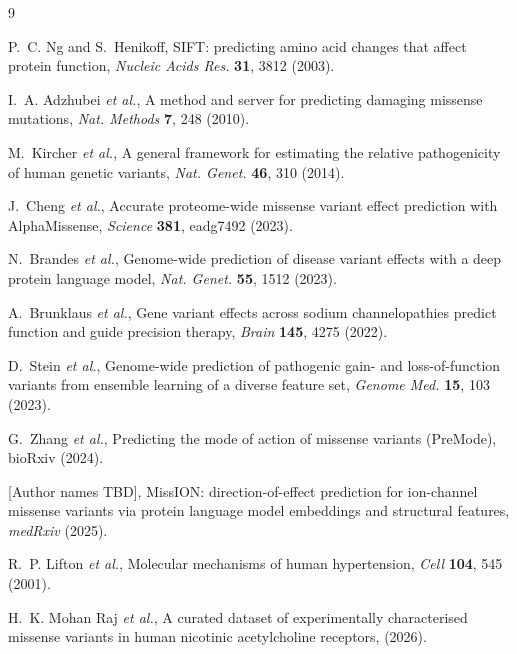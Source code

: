 \documentclass{ws-procs11x85}
\begin{document}
\begin{thebibliography}{9}

 P.~C. Ng and S.~Henikoff, SIFT: predicting amino acid
changes that affect protein function, {\em Nucleic Acids Res.}
{\bf 31}, 3812 (2003).

 I.~A. Adzhubei {\em et al.}, A method and server
for predicting damaging missense mutations, {\em Nat. Methods}
{\bf 7}, 248 (2010).

 M.~Kircher {\em et al.}, A general framework for
estimating the relative pathogenicity of human genetic variants,
{\em Nat. Genet.} {\bf 46}, 310 (2014).

 J.~Cheng {\em et al.}, Accurate proteome-wide
missense variant effect prediction with AlphaMissense, {\em Science}
{\bf 381}, eadg7492 (2023).

 N.~Brandes {\em et al.}, Genome-wide prediction of
disease variant effects with a deep protein language model,
{\em Nat. Genet.} {\bf 55}, 1512 (2023).

 A.~Brunklaus {\em et al.}, Gene variant effects
across sodium channelopathies predict function and guide precision
therapy, {\em Brain} {\bf 145}, 4275 (2022).

 D.~Stein {\em et al.}, Genome-wide prediction of
pathogenic gain- and loss-of-function variants from ensemble learning
of a diverse feature set, {\em Genome Med.} {\bf 15}, 103 (2023).

 G.~Zhang {\em et al.}, Predicting the mode of action
of missense variants (PreMode), bioRxiv (2024).

 [Author names TBD], MissION: direction-of-effect
prediction for ion-channel missense variants via protein language model
embeddings and structural features, {\em medRxiv} (2025).

 R.~P. Lifton {\em et al.}, Molecular mechanisms of
human hypertension, {\em Cell} {\bf 104}, 545 (2001).

 H.~K. Mohan Raj {\em et al.}, A curated dataset of
experimentally characterised missense variants in human nicotinic
acetylcholine receptors, (2026).

\end{thebibliography}
\end{document}
